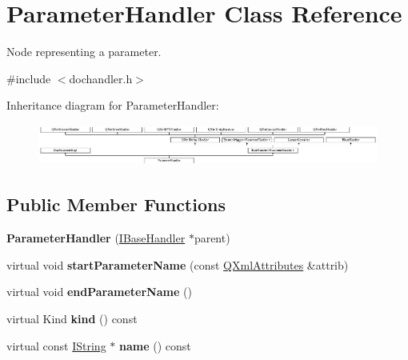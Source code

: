 \hypertarget{class_parameter_handler}{}\section{Parameter\+Handler Class Reference}
\label{class_parameter_handler}


Node representing a parameter.  




{\ttfamily \#include $<$dochandler.\+h$>$}

Inheritance diagram for Parameter\+Handler\+:\begin{figure}[H]
\begin{center}
\leavevmode
\includegraphics[height=1.361702cm]{class_parameter_handler}
\end{center}
\end{figure}
\subsection*{Public Member Functions}
\begin{DoxyCompactItemize}
\item 
\mbox{\label{class_parameter_handler_a8c5fb5c7f305fab93a3479dd42d769e7}} 
{\bfseries Parameter\+Handler} (\mbox{\hyperlink{class_i_base_handler}{I\+Base\+Handler}} $\ast$parent)
\item 
\mbox{\label{class_parameter_handler_a04da6a3e432894b73eeba62424c082c3}} 
virtual void {\bfseries start\+Parameter\+Name} (const \mbox{\hyperlink{class_q_xml_attributes}{Q\+Xml\+Attributes}} \&attrib)
\item 
\mbox{\label{class_parameter_handler_a89c1ea9adb2f18b0902045deb8aa0637}} 
virtual void {\bfseries end\+Parameter\+Name} ()
\item 
\mbox{\label{class_parameter_handler_a978a0486fd7eae623271dee5b94d9728}} 
virtual Kind {\bfseries kind} () const
\item 
\mbox{\label{class_parameter_handler_ab37b9dc89369a11cf5bd0d7c1ffa537b}} 
virtual const \mbox{\hyperlink{class_i_string}{I\+String}} $\ast$ {\bfseries name} () const
\end{DoxyCompactItemize}
